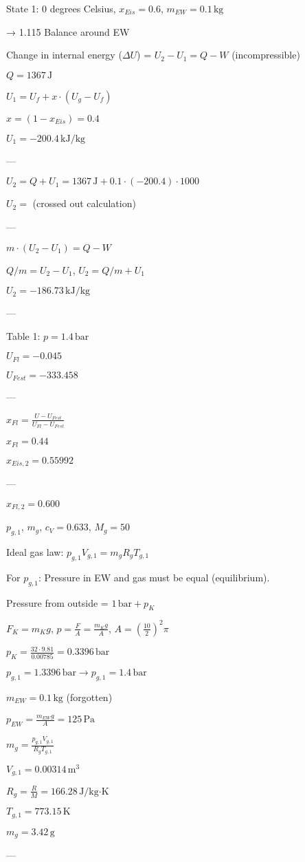 State 1: 0 degrees Celsius, \( x_{Eis} = 0.6 \), \( m_{EW} = 0.1 \, \text{kg} \)

→ 1.115 Balance around EW

Change in internal energy (\( \Delta U \)) = \( U_2 - U_1 = Q - W \) (incompressible)

\( Q = 1367 \, \text{J} \)

\( U_1 = U_f + x \cdot (U_g - U_f) \)

\( x = (1 - x_{Eis}) = 0.4 \)

\( U_1 = -200.4 \, \text{kJ/kg} \)

---

\( U_2 = Q + U_1 = 1367 \, \text{J} + 0.1 \cdot (-200.4) \cdot 1000 \)

\( U_2 = \) (crossed out calculation)

---

\( m \cdot (U_2 - U_1) = Q - W \)

\( Q / m = U_2 - U_1 \), \( U_2 = Q / m + U_1 \)

\( U_2 = -186.73 \, \text{kJ/kg} \)

---

Table 1: \( p = 1.4 \, \text{bar} \)

\( U_{Fl} = -0.045 \)

\( U_{Fest} = -333.458 \)

---

\( x_{Fl} = \frac{U - U_{Fest}}{U_{Fl} - U_{Fest}} \)

\( x_{Fl} = 0.44 \)

\( x_{Eis,2} = 0.55992 \)

---

\( x_{Fl,2} = 0.600 \)

\( p_{g,1} \), \( m_g \), \( c_V = 0.633 \), \( M_g = 50 \)  

Ideal gas law:  
\( p_{g,1} V_{g,1} = m_g R_g T_{g,1} \)  

For \( p_{g,1} \): Pressure in EW and gas must be equal (equilibrium).  

Pressure from outside = \( 1 \, \text{bar} + p_K \)  

\( F_K = m_K g \), \( p = \frac{F}{A} = \frac{m_K g}{A} \), \( A = \left(\frac{10}{2}\right)^2 \pi \)  

\( p_K = \frac{32 \cdot 9.81}{0.00785} = 0.3396 \, \text{bar} \)  

\( p_{g,1} = 1.3396 \, \text{bar} \rightarrow p_{g,1} = 1.4 \, \text{bar} \)  

\( m_{EW} = 0.1 \, \text{kg} \) (forgotten)  

\( p_{EW} = \frac{m_{EW} g}{A} = 125 \, \text{Pa} \)  

\( m_g = \frac{p_{g,1} V_{g,1}}{R_g T_{g,1}} \)  

\( V_{g,1} = 0.00314 \, \text{m}^3 \)  

\( R_g = \frac{R}{M} = 166.28 \, \text{J/kg·K} \)  

\( T_{g,1} = 773.15 \, \text{K} \)  

\( m_g = 3.42 \, \text{g} \)  

---